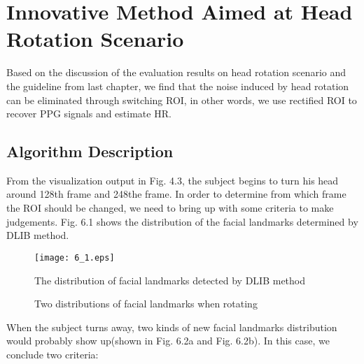 \chapter{Innovative Method Aimed at Head Rotation Scenario}
Based on the discussion of the evaluation results on head rotation scenario and the guideline from last chapter, we find that the noise induced by head rotation can be eliminated through switching ROI, in other words, we use rectified ROI to recover PPG signals and estimate HR.

\section{Algorithm Description}
From the visualization output in Fig. 4.3, the subject begins to turn his head around 128th frame and 248the frame. In order to determine from which frame the ROI should be changed, we need to bring up with some criteria to make judgements. Fig. 6.1 shows the distribution of the facial landmarks determined by DLIB method.

\begin{figure}[ht]
\centering
\texttt{[image: 6\_1.eps]}
\caption{The distribution of facial landmarks detected by DLIB method}\label{fig:noted-figure}
\end{figure}

\begin{figure}[ht]
\hspace{-0.3in}
\caption{Two distributions of facial landmarks when rotating}\label{fig:noted-figure}
\end{figure}

When the subject turns away, two kinds of new facial landmarks distribution would probably show up(shown in Fig. 6.2a and Fig. 6.2b). In this case, we conclude two criteria:

